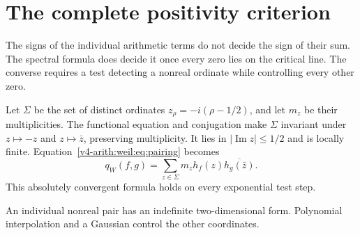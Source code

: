 \section{The complete positivity criterion}
\label{v4-arith:weil:positivity}

The signs of the individual arithmetic terms do not decide the sign of
their sum. The spectral formula does decide it once every zero lies on
the critical line. The converse requires a test detecting a nonreal
ordinate while controlling every other zero.

Let \(\Sigma\) be the set of distinct ordinates
\(z_\rho=-i(\rho-1/2)\), and let \(m_z\) be their multiplicities.
The functional equation and conjugation make \(\Sigma\) invariant under
\(z\mapsto-z\) and \(z\mapsto\bar z\), preserving multiplicity.
It lies in \(|\operatorname{Im}z|\le1/2\) and is locally finite.
Equation~\eqref{v4-arith:weil:eq:pairing} becomes
\begin{equation}
 q_W(f,g)=\sum_{z\in\Sigma}m_z
                 h_f(z)\overline{h_g(\bar z)}.
 \label{v4-arith:weil:eq:distinct-pairing}
\end{equation}
This absolutely convergent formula holds on every exponential test step.

An individual nonreal pair has an indefinite two-dimensional form.
Polynomial interpolation and a Gaussian control the other coordinates.

